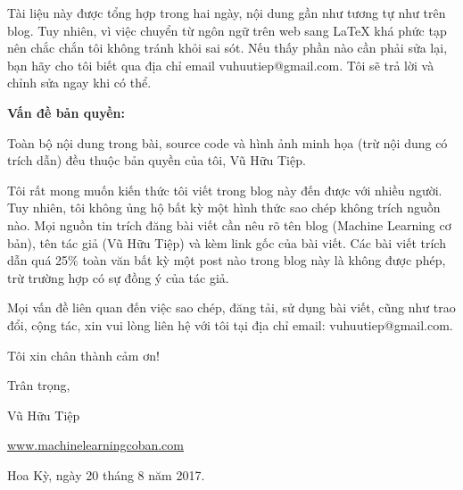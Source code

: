 
Tài liệu này được tổng hợp trong hai ngày, nội dung gần như tương tự như trên blog. Tuy nhiên, vì việc chuyển từ ngôn ngữ trên web sang LaTeX khá phức tạp nên chắc chắn tôi không tránh khỏi sai sót. Nếu thấy phần nào cần phải sửa lại, bạn hãy cho tôi biết qua địa chỉ email vuhuutiep@gmail.com. Tôi sẽ trả lời và chỉnh sửa ngay khi có thể. 


\textbf{Vấn đề bản quyền:}

Toàn bộ nội dung trong bài, source code và hình ảnh minh họa (trừ nội dung có trích dẫn) đều thuộc bản quyền của tôi, Vũ Hữu Tiệp. 

Tôi rất mong muốn kiến thức tôi viết trong blog này đến được với nhiều người. Tuy nhiên, tôi không ủng hộ bất kỳ một hình thức sao chép không trích nguồn nào. Mọi nguồn tin trích đăng bài viết cần nêu rõ tên blog (Machine Learning cơ bản), tên tác giả (Vũ Hữu Tiệp) và kèm link gốc của bài viết. Các bài viết trích dẫn quá 25\% toàn văn bất kỳ một post nào trong blog này là không được phép, trừ trường hợp có sự đồng ý của tác giả.

Mọi vấn đề liên quan đến việc sao chép, đăng tải, sử dụng bài viết, cũng như trao đổi, cộng tác, xin vui lòng liên hệ với tôi tại địa chỉ email: vuhuutiep@gmail.com.

Tôi xin chân thành cảm ơn!

Trân trọng,

Vũ Hữu Tiệp

\href{www.machinelearningcoban.com}{www.machinelearningcoban.com}

Hoa Kỳ, ngày 20 tháng 8 năm 2017.

